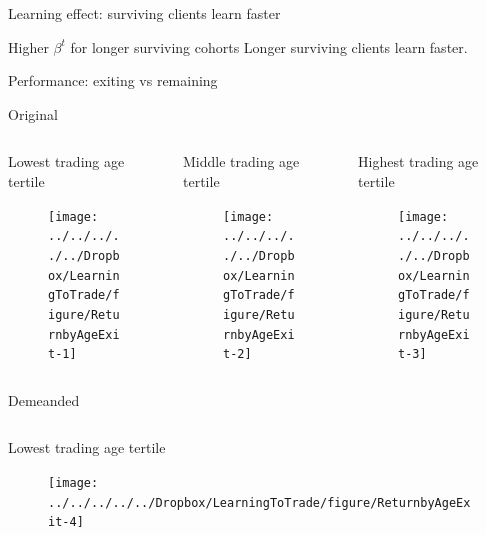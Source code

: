 \documentclass{beamer}
\begin{document}
\begin{frame}{Learning effect: surviving clients learn faster}
\begin{block}{Higher $\beta^t$ for longer surviving cohorts}
Longer surviving clients learn faster.
\end{block}


\end{frame}



\begin{frame}{Performance: exiting vs remaining}

Original
\vskip -0.65cm
	\begin{columns}[t]
		\begin{column}{0.32\textwidth}
			\begin{block}{\footnotesize Lowest trading age tertile}
				\begin{figure}
					\texttt{[image: ../../../../../Dropbox/LearningToTrade/figure/ReturnbyAgeExit-1]}
				\end{figure}
			\end{block}
		\end{column}

		\begin{column}{0.32\textwidth}
			\begin{block}{\footnotesize Middle trading age tertile}
				\begin{figure}
					\texttt{[image: ../../../../../Dropbox/LearningToTrade/figure/ReturnbyAgeExit-2]}
				\end{figure}
			\end{block}
		\end{column}

			\begin{column}{0.32\textwidth}
		\begin{block}{\footnotesize Highest trading age tertile}
			\begin{figure}
				\texttt{[image: ../../../../../Dropbox/LearningToTrade/figure/ReturnbyAgeExit-3]}
			\end{figure}
		\end{block}
	\end{column}
	\end{columns}
\vskip 0.2cm

Demeanded
\vskip -0.65cm
	\begin{columns}[t]
		\begin{column}{0.32\textwidth}
			\begin{block}{\footnotesize Lowest trading age tertile}
				\begin{figure}
					\texttt{[image: ../../../../../Dropbox/LearningToTrade/figure/ReturnbyAgeExit-4]}
				\end{figure}
			\end{block}
		\end{column}


\end{columns}
\end{frame}
\end{document}

